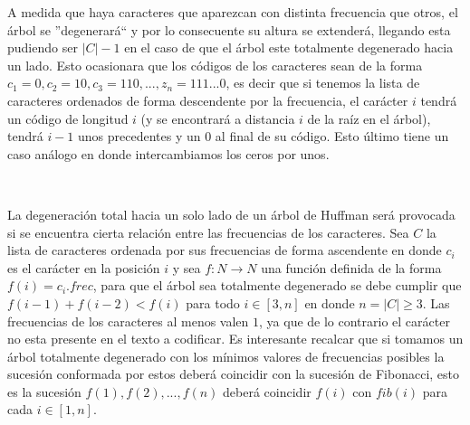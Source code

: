 A medida que haya caracteres que aparezcan con distinta frecuencia que otros, el \'arbol se ''degenerar\'a`` y por lo consecuente su altura se extender\'a, llegando esta pudiendo ser $|C|-1$ en el caso de que el \'arbol este totalmente degenerado hacia un lado. Esto ocasionara que los c\'odigos de los caracteres sean de la forma $c_1=0, c_2=10, c_3=110, ... , z_n = 111...0$, es decir que si tenemos la lista de caracteres ordenados de forma descendente por la frecuencia, el car\'acter $i$ tendr\'a un c\'odigo de longitud $i$ (y se encontrar\'a a distancia $i$ de la ra\'iz en el \'arbol), tendr\'a $i-1$ unos precedentes y un $0$ al final de su c\'odigo. Esto \'ultimo tiene un caso an\'alogo en donde intercambiamos los ceros por unos.

~

La degeneraci\'on total hacia un solo lado de un \'arbol de Huffman ser\'a provocada si se encuentra cierta relaci\'on entre las frecuencias de los caracteres. Sea $C$ la lista de caracteres ordenada por sus frecuencias de forma ascendente en donde $c_i$ es el car\'acter en la posici\'on $i$ y sea $f: N \rightarrow N$ una funci\'on definida de la forma $f(i) = c_i.frec$, para que el \'arbol sea totalmente degenerado se debe cumplir que $f(i-1) + f(i-2) < f(i)$ para todo $i \in [3, n]$ en donde $n=|C| \geq 3$. Las frecuencias de los caracteres al menos valen $1$, ya que de lo contrario el car\'acter no esta presente en el texto a codificar. Es interesante recalcar que si tomamos un \'arbol totalmente degenerado con los m\'inimos valores de frecuencias posibles la sucesi\'on conformada por estos deber\'a coincidir con la sucesi\'on de Fibonacci, esto es la sucesi\'on $f(1), f(2), ..., f(n)$ deber\'a coincidir $f(i)$ con $fib(i)$ para cada $i \in [1,n]$.


%
%

